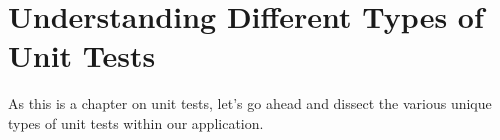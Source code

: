 \maketitle{}
\section{ Understanding Different Types of Unit Tests }
As this is a chapter on unit tests, let's go ahead and dissect the various
unique types of unit tests within our application.
